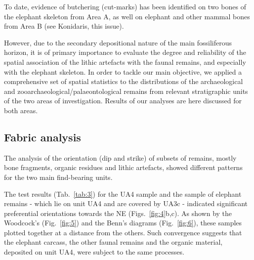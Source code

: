 \documentclass[preprint,authoryear,times]{elsarticle} %
\begin{document}
To date, evidence of butchering (cut-marks) has been identified on two bones of the elephant skeleton from Area A, as well on elephant and other mammal bones from Area B (see Konidaris, this issue).

However, due to the secondary depositional nature of the main fossiliferous horizon, it is of primary importance to evaluate the degree and reliability of the spatial association of the lithic artefacts with the faunal remains, and especially with the elephant skeleton. In order to tackle our main objective, we applied a comprehensive set of spatial statistics to the distributions of the archaeological and zooarchaeological/palaeontological remains from relevant stratigraphic units of the two areas of investigation. Results of our analyses are here discussed for both areas.

\subsection{Fabric analysis}



The analysis of the orientation (dip and strike) of subsets of remains, mostly bone fragments, organic residues and lithic artefacts, showed different patterns for the two main find-bearing units.


The test results (Tab.~\ref{tab:3}) for the UA4 sample and the sample of elephant remains - which lie on unit UA4 and are covered by UA3c - indicated significant preferential orientations towards the NE (Figs.~\ref{fig:4}b,c). As shown by the Woodcock's (Fig.~\ref{fig:5}) and the Benn's diagrams (Fig.~\ref{fig:6}), these samples plotted together at a distance from the others. Such convergence suggests that the elephant carcass, the other faunal remains and the organic material, deposited on unit UA4, were subject to the same processes.
\end{document}
